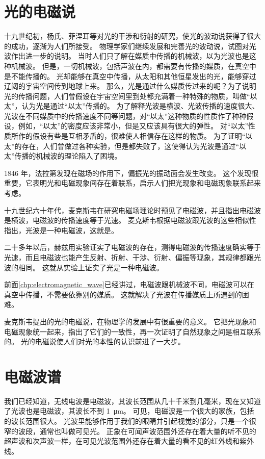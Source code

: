 \section{光的电磁说}
十九世纪初，杨氏、菲涅耳等对光的干涉和衍射的研究，使光的波动说获得了很大的成功，逐渐为人们所接受。
物理学家们继续发展和完善光的波动说，试图对光波作出进一步的说明。
当时人们只了解在媒质中传播的机械波，以为光波也是这种机械波。
但是，一切机械波，包括声波在内，都需要有传播的媒质，在真空中是不能传播的。
光却能够在真空中传播，从太阳和其他恒星发出的光，能够穿过辽阔的宇宙空间传到地球上来。
那么，光是通过什么媒质传过来的呢？为了说明光的传播问题，人们曾假设在宇宙空间里到处都充满着一种特殊的物质，叫做“以太”，认为光是通过“以太”传播的。
为了解释光波是横波、光波传播的速度很大、光波在不同媒质中的传播速度不同等问题，对“以太”这种物质的性质作了种种假设，例如，“以太”的密度应该非常小，但是又应该具有很大的弹性。
对“以太”性质所作的假设有些是互相矛盾的，很难使人相信存在这样的物质。
为了证明“以太”的存在，人们曾做过各种实验，但是都失败了，这使得认为光波是通过“以太”传播的机械波的理论陷入了困境。

1846 年，法拉第发现在磁场的作用下，偏振光的振动面会发生改变。
这个发现很重要，它表明光和电磁现象间存在着联系，启示人们把光现象和电磁现象联系起来考虑。

十九世纪六十年代，麦克斯韦在研究电磁场理论时预见了电磁波，并且指出电磁波是横波，电磁波的传播速度等于光速。
麦克斯韦根据电磁波跟光波的这些相似性指出，光波是一种电磁波，这就是。

二十多年以后，赫兹用实验证实了电磁波的存在，测得电磁波的传播速度确实等于光速，而且电磁波也能产生反射、折射、干涉、衍射、偏振等现象，其规律都跟光波的相同。
这就从实验上证实了光是一种电磁波。

前面\cref{chp:electromagnetic_wave}已经讲过，电磁波跟机械波不同，电磁波可以在真空中传播，不需要依靠别的媒质。
这就解决了光波在传播媒质上所遇到的困难。

麦克斯韦提出的光的电磁说，在物理学的发展中有很重要的意义。
它把光现象和电磁现象统一起来，指出了它们的一致性，再一次证明了自然现象之间是相互联系的。
光的电磁说使人们对光的本性的认识前进了一大步。

\section{电磁波谱}
我们已经知道，无线电波是电磁波，其波长范围从几十千米到几毫米，现在又知道了光波也是电磁波，其波长不到 \qty{1}{\micro m}。
可见，电磁波是一个很大的家族，包括的波长范围很大。
光波里能够作用于我们的眼睛并引起视觉的部分，只是一个很窄的波段，通常也叫做可见光。
正象在可闻声波范围外还存在着大量的听不见的超声波和次声波一样，在可见光波范围外还存在着大量的看不见的红外线和紫外线。

